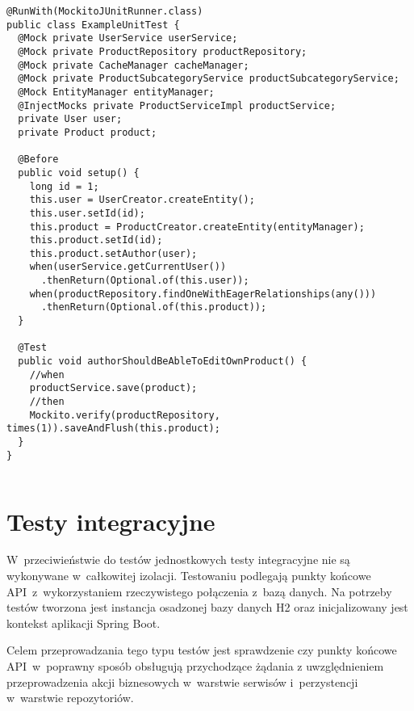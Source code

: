 \noindent\hspace{.075\textwidth}\begin{minipage}{.85\textwidth}
\begin{verbatim}
@RunWith(MockitoJUnitRunner.class)
public class ExampleUnitTest {
  @Mock private UserService userService;
  @Mock private ProductRepository productRepository;
  @Mock private CacheManager cacheManager;
  @Mock private ProductSubcategoryService productSubcategoryService;
  @Mock EntityManager entityManager;
  @InjectMocks private ProductServiceImpl productService;
  private User user;
  private Product product;

  @Before
  public void setup() {
    long id = 1;
    this.user = UserCreator.createEntity();
    this.user.setId(id);
    this.product = ProductCreator.createEntity(entityManager);
    this.product.setId(id);
    this.product.setAuthor(user);
    when(userService.getCurrentUser())
      .thenReturn(Optional.of(this.user));
    when(productRepository.findOneWithEagerRelationships(any()))
      .thenReturn(Optional.of(this.product));
  }

  @Test
  public void authorShouldBeAbleToEditOwnProduct() {
    //when
    productService.save(product);
    //then
    Mockito.verify(productRepository, times(1)).saveAndFlush(this.product);
  }
}
\end{verbatim}
\begin{lstlisting}[caption={Przykładowy test jednostkowy \source{\ownwork}}, label={listing:unit-test}]
\end{lstlisting}
\end{minipage}

\section{Testy integracyjne}

W~przeciwieństwie do testów jednostkowych testy integracyjne nie są wykonywane w~całkowitej izolacji\cite{book:testy-jednostkowe}.
Testowaniu podlegają punkty końcowe API~z~wykorzystaniem rzeczywistego połączenia z~bazą danych.
Na potrzeby testów tworzona jest instancja osadzonej bazy danych H2\cite{tech:h2-db} oraz inicjalizowany jest kontekst aplikacji Spring Boot.

\par
Celem przeprowadzania tego typu testów jest sprawdzenie czy punkty końcowe API~w~poprawny sposób obsługują przychodzące żądania
z uwzględnieniem przeprowadzenia akcji biznesowych w~warstwie serwisów i~perzystencji w~warstwie repozytoriów.

